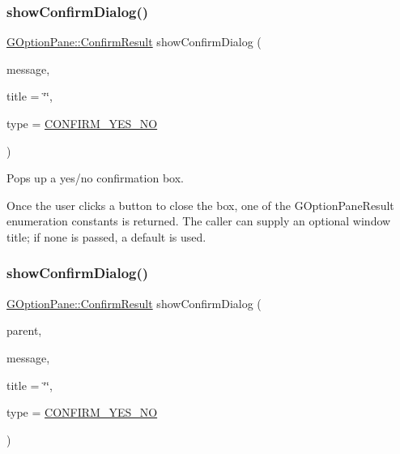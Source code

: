 \subsubsection{\texorpdfstring{show\+Confirm\+Dialog()}{showConfirmDialog()}\hspace{0.1cm}{\footnotesize\ttfamily [1/3]}}
{\footnotesize\ttfamily \mbox{\hyperlink{classGOptionPane_a1cc9e8685029e39646671ed71f32d47d}{G\+Option\+Pane\+::\+Confirm\+Result}} show\+Confirm\+Dialog (\begin{DoxyParamCaption}\item[{const std\+::string \&}]{message,  }\item[{const std\+::string \&}]{title = {\ttfamily \char`\"{}\char`\"{}},  }\item[{\mbox{\hyperlink{classGOptionPane_a6a1aaf19c06f5a6bef89ea6415547049}{Confirm\+Type}}}]{type = {\ttfamily \mbox{\hyperlink{classGOptionPane_a6a1aaf19c06f5a6bef89ea6415547049a964914d27eb73a202938a53f43adc4b1}{C\+O\+N\+F\+I\+R\+M\+\_\+\+Y\+E\+S\+\_\+\+NO}}} }\end{DoxyParamCaption})\hspace{0.3cm}{\ttfamily [static]}}



Pops up a yes/no confirmation box. 

Once the user clicks a button to close the box, one of the G\+Option\+Pane\+Result enumeration constants is returned. The caller can supply an optional window title; if none is passed, a default is used. \mbox{\label{classGOptionPane_a9afd93d6b7b63d77370c87e60285ae71}} 
\subsubsection{\texorpdfstring{show\+Confirm\+Dialog()}{showConfirmDialog()}\hspace{0.1cm}{\footnotesize\ttfamily [2/3]}}
{\footnotesize\ttfamily \mbox{\hyperlink{classGOptionPane_a1cc9e8685029e39646671ed71f32d47d}{G\+Option\+Pane\+::\+Confirm\+Result}} show\+Confirm\+Dialog (\begin{DoxyParamCaption}\item[{\mbox{\hyperlink{classGWindow}{G\+Window}} $\ast$}]{parent,  }\item[{const std\+::string \&}]{message,  }\item[{const std\+::string \&}]{title = {\ttfamily \char`\"{}\char`\"{}},  }\item[{\mbox{\hyperlink{classGOptionPane_a6a1aaf19c06f5a6bef89ea6415547049}{Confirm\+Type}}}]{type = {\ttfamily \mbox{\hyperlink{classGOptionPane_a6a1aaf19c06f5a6bef89ea6415547049a964914d27eb73a202938a53f43adc4b1}{C\+O\+N\+F\+I\+R\+M\+\_\+\+Y\+E\+S\+\_\+\+NO}}} }\end{DoxyParamCaption})\hspace{0.3cm}{\ttfamily [static]}}



